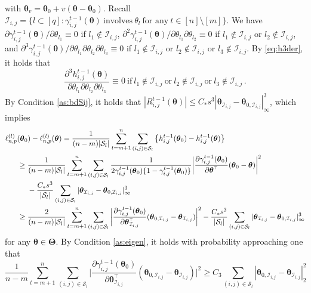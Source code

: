 \documentclass[12pt]{article}
\newcommand{\bTheta}{\boldsymbol \Theta}
\newcommand{\btheta}{\boldsymbol \theta}
\def\T{{\scriptscriptstyle \top} }
\newcommand{\0}{{\bf 0}}
\begin{document}
with $\btheta_v=\btheta_0+v(\btheta-\btheta_0)$. Recall $\mathcal{I}_{i,j}=\{l\subset[q]:\gamma_{i,j}^{t-1}(\btheta)~\textrm{involves}~\theta_l~\textrm{for any}~t\in[n]\setminus[m]\}$. We have 
$\partial\gamma_{i,j}^{t-1}(\btheta)/\partial\theta_{l_1}\equiv0$ if $l_1\notin\mathcal{I}_{i,j}$, 
$\partial^2\gamma_{i,j}^{t-1}(\btheta)/\partial\theta_{l_1}\partial\theta_{l_2}\equiv0$ if $l_1\notin\mathcal{I}_{i,j}$ or $l_2\notin\mathcal{I}_{i,j}$, and $\partial^3\gamma_{i,j}^{t-1}(\btheta)/\partial\theta_{l_1}\partial\theta_{l_2}\partial\theta_{l_3}\equiv0$ if $l_1\notin\mathcal{I}_{i,j}$ or $l_2\notin\mathcal{I}_{i,j}$ or $l_3\notin\mathcal{I}_{i,j}$. By \eqref{eq:h3der}, it holds that
\[
\frac{\partial^3h_{i,j}^{t-1}(\btheta)}{\partial\theta_{l_1}\partial\theta_{l_2}\partial\theta_{l_3}}\equiv0~\textrm{if}~l_1\notin\mathcal{I}_{i,j}~\textrm{or}~ l_2\notin\mathcal{I}_{i,j}~\textrm{or}~l_3\notin\mathcal{I}_{i,j}\,.
\]
By Condition \ref{as:bdSij}, it holds that 
$
|R_{i,j}^{t-1}(\btheta)|\leq C_*s^3|\btheta_{\mathcal{I}_{i,j}}-\btheta_{0,\mathcal{I}_{i,j}}|_\infty^3$, 
which implies
\begin{align}
&\ell_{n,p}^{(l)}(\btheta_0)-\ell_{n,p}^{(l)}(\btheta)=\frac{1}{(n-m)|\mathcal{S}_l|}\sum_{t=m+1}^n\sum_{(i,j)\in\mathcal{S}_l}\big\{h_{i,j}^{t-1}(\btheta_0)-h_{i,j}^{t-1}(\btheta)\big\}\notag\\
&~~~~~\geq\frac{1}{(n-m)|\mathcal{S}_l|}\sum_{t=m+1}^n\sum_{(i,j)\in\mathcal{S}_l}\frac{1}{2\gamma_{i,j}^{t-1}(\btheta_0)\{1-\gamma_{i,j}^{t-1}(\btheta_0)\}}\bigg|\frac{\partial\gamma_{i,j}^{t-1}(\btheta_0)}{\partial\btheta^{\T}}(\btheta_0-\btheta)\bigg|^2\label{eq:diffbarell}\\
&~~~~~~~~~-\frac{C_*s^3}{|\mathcal{S}_l|}\sum_{(i,j)\in\mathcal{S}_l}|\btheta_{\mathcal{I}_{i,j}}-\btheta_{0,\mathcal{I}_{i,j}}|_\infty^3\notag\\
&~~~~~\geq\frac{2}{(n-m)|\mathcal{S}_l|}\sum_{t=m+1}^n\sum_{(i,j)\in\mathcal{S}_l}\bigg|\frac{\partial\gamma_{i,j}^{t-1}(\btheta_0)}{\partial\btheta^{\T}_{\mathcal{I}_{i,j}}}(\btheta_{0,\mathcal{I}_{i,j}}-\btheta_{\mathcal{I}_{i,j}})\bigg|^2-\frac{C_*s^3}{|\mathcal{S}_l|}\sum_{(i,j)\in\mathcal{S}_l}|\btheta_{\mathcal{I}_{i,j}}-\btheta_{0,\mathcal{I}_{i,j}}|_\infty^3\notag
\end{align}
for any $\btheta\in\bTheta$. By  Condition \ref{as:eigen}, it holds with probability approaching one that 
\[
\frac{1}{n-m}\sum_{t=m+1}^n\sum_{(i,j)\in\mathcal{S}_l}\bigg|\frac{\partial\gamma_{i,j}^{t-1}(\btheta_0)}{\partial\btheta^{\T}_{\mathcal{I}_{i,j}}}(\btheta_{0,\mathcal{I}_{i,j}}-\btheta_{\mathcal{I}_{i,j}})\bigg|^2\geq C_3\sum_{(i,j)\in\mathcal{S}_l}|\btheta_{0,\mathcal{I}_{i,j}}-\btheta_{\mathcal{I}_{i,j}}|_2^2
\]
\end{document}
